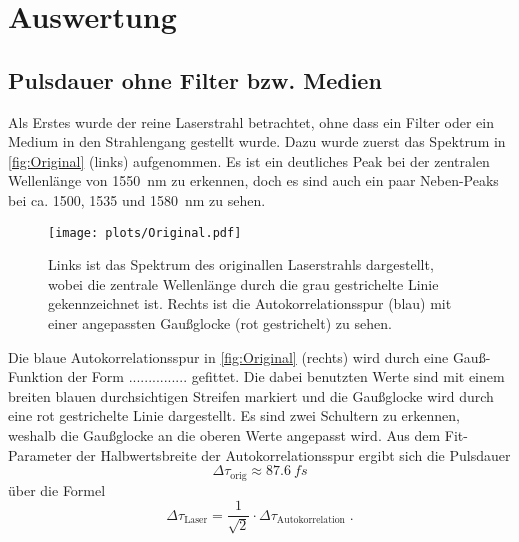 \newpage
\section{Auswertung}
\label{sec:auswertung}
\subsection{Pulsdauer ohne Filter bzw. Medien}
    Als Erstes wurde der reine Laserstrahl betrachtet, ohne dass ein Filter oder ein Medium in den Strahlengang gestellt wurde.
    Dazu wurde zuerst das Spektrum in \autoref{fig:Original} (links) aufgenommen.
    Es ist ein deutliches Peak bei der zentralen Wellenlänge von \qty{1550}{nm} zu erkennen, doch es sind auch ein paar Neben-Peaks bei ca. 1500, 1535 und \qty{1580}{nm} zu sehen.
    \vspace*{-0.3cm}
    \begin{figure}[ht]
        \centering\captionsetup{format=plain}
        \texttt{[image: plots/Original.pdf]} \vspace*{-0.5cm}
        \caption{Links ist das Spektrum des originallen Laserstrahls dargestellt, wobei die zentrale Wellenlänge durch die grau gestrichelte Linie gekennzeichnet ist. Rechts ist die Autokorrelationsspur (blau) mit einer angepassten Gaußglocke (rot gestrichelt) zu sehen.}
        \label{fig:Original}
    \end{figure}
    \FloatBarrier
    Die blaue Autokorrelationsspur in \autoref{fig:Original} (rechts) wird durch eine Gauß-Funktion der Form ............... gefittet.
    Die dabei benutzten Werte sind mit einem breiten blauen durchsichtigen Streifen markiert und die Gaußglocke wird durch eine rot gestrichelte Linie dargestellt.
    Es sind zwei Schultern zu erkennen, weshalb die Gaußglocke an die oberen Werte angepasst wird.
    Aus dem Fit-Parameter der Halbwertsbreite der Autokorrelationsspur ergibt sich die Pulsdauer
    \begin{equation*}
        \Delta \tau_{\mathrm{orig}} \approx \qty{87,6}{fs}
    \end{equation*}
    über die Formel
    \begin{equation}
        \Delta \tau_{\mathrm{Laser}} = \frac{1}{\sqrt{2}} \cdot \Delta \tau_{\mathrm{Autokorrelation}}\;.
    \end{equation}

